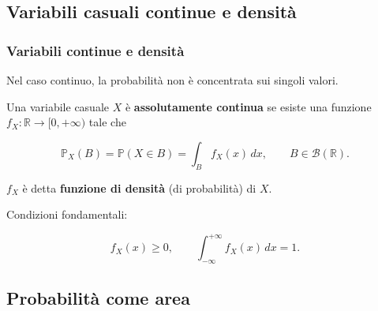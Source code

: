 \documentclass[handout]{beamer}%
\providecommand{\Prob}{\mathbb{P}}
\providecommand{\1}{\mathbf{1}}
\providecommand{\QTR}[2]{\csname #1\endcsname{#2}}
\begin{document}


\subsection{Variabili casuali continue e densit\`{a}}%

\begin{frame}%
%

\frametitle{Variabili continue e densit\`{a}}%


Nel caso continuo, la probabilit\`{a} non \`{e} concentrata sui singoli valori.

\medskip

Una variabile casuale $X$ \`{e} \textbf{assolutamente continua} se esiste una
funzione $f_{X}:\mathbb{R}\to[0,+\infty)$ tale che%

\[
\Prob_{X}(B) = \Prob(X\in B) = \int_{B} f_{X}(x)\,dx, \qquad B\in
\mathcal{B}(\mathbb{R}).
\]


\medskip

$f_{X}$ \`{e} detta \textbf{funzione di densit\`{a}} (di probabilit\`{a}) di
$X$.

\medskip

Condizioni fondamentali:%

\[
f_{X}(x)\geq0, \qquad\int_{-\infty}^{+\infty}f_{X}(x)\,dx=1.
\]
%

\transboxout
\end{frame}%




\subsection{Probabilit\`{a} come area}%
\end{document}
